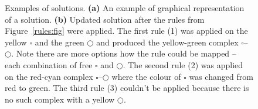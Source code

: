 \documentclass[12pt, twoside]{fithesis2} %
\begin{document}
\begin{figure}[!h]
\begin{center}
\end{center}
\caption{Examples of solutions. \textbf{(a)} An example of graphical representation of a solution. \textbf{(b)} Updated solution after the rules from Figure~\ref{rules:fig} were applied. The first rule (1) was applied on the yellow {\large $\square$} and the green $\bigcirc$ and produced the yellow-green complex {\large $\square$}--$\bigcirc$. Note there are more options how the rule could be mapped -- each combination of free {\large $\square$} and $\bigcirc$. The second rule (2) was applied on the red-cyan complex {\large $\square$}--$\bigcirc$ where the colour of {\large $\square$} was changed from red to green. The third rule (3) couldn't be applied because there is no such complex with a yellow $\bigcirc$. }\label{solutions:fig}
\end{figure}

\end{document}
